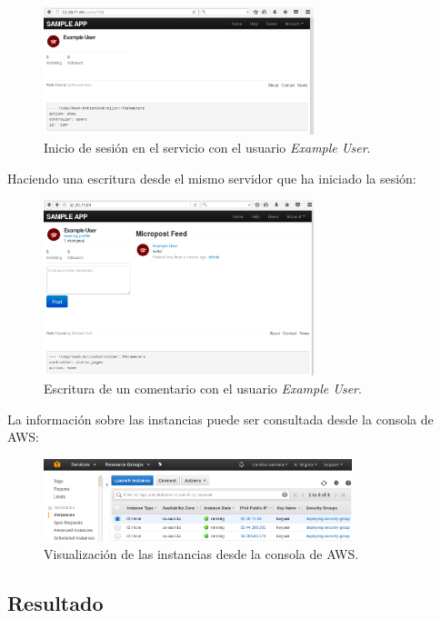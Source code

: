 \begin{figure}[H]
\centering
\includegraphics[width=0.7\textwidth]{images/figures/login-confd.png}
\caption{Inicio de sesión en el servicio con el usuario \textit{Example User}.}
\end{figure}

Haciendo una escritura desde el mismo servidor que ha iniciado la sesión:

\begin{figure}[H]
\centering
\includegraphics[width=0.7\textwidth]{images/figures/post-confd.png}
\caption{Escritura de un comentario con el usuario \textit{Example User}.}
\end{figure}

La información sobre las instancias puede ser consultada desde la consola de AWS:

\begin{figure}[H]
\centering
\includegraphics[width=0.8\textwidth]{images/figures/aws-confd.png}
\caption{Visualización de las instancias desde la consola de AWS.}
\end{figure}

\subsection{Resultado}

